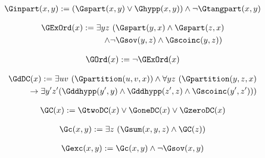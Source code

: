 \begin{erin}
    \begin{align*}
        \Ginpart(x, y) := (\Gspart(x,y) \vee \Ghypp(x,y)) \land \neg \Gtangpart(x, y)
    \end{align*}
\end{erin}

\begin{erin}
    \begin{align*}
        \GExOrd(x) := \exists yz\ (&\Gspart(y,x) \wedge \Gspart(z,x) \\
        \wedge \neg&\Gsov(y,z) \wedge \Gscoinc(y,z))
    \end{align*}
\end{erin}

\begin{erin}
    \begin{align*}
        \GOrd(x) := \neg\GExOrd(x)
    \end{align*}
\end{erin}

\begin{erin}
    \begin{align*}
        \GdDC(x) := \exists uv\ (\Gpartition(u,v,x)) \wedge \forall yz\ (\Gpartition(y,z,x)\\ 
        \to 
        \exists y'z'(\Gddhypp(y',y) \wedge \Gddhypp(z',z) \wedge \Gscoinc(y',z')))
    \end{align*}
\end{erin}

\begin{erin}
    \begin{align*}
        \GC(x) := \GtwoDC(x) \vee \GoneDC(x) \vee \GzeroDC(x)
    \end{align*}
\end{erin}

\begin{erin}
    \begin{align*}
        \Gc(x,y) := \exists z\ (\Gsum(x,y,z) \wedge \GC(z))
    \end{align*}
\end{erin}

\begin{erin}
    \begin{align*}
        \Gexc(x,y) := \Gc(x,y) \wedge \neg\Gsov(x,y)
    \end{align*}
\end{erin}

